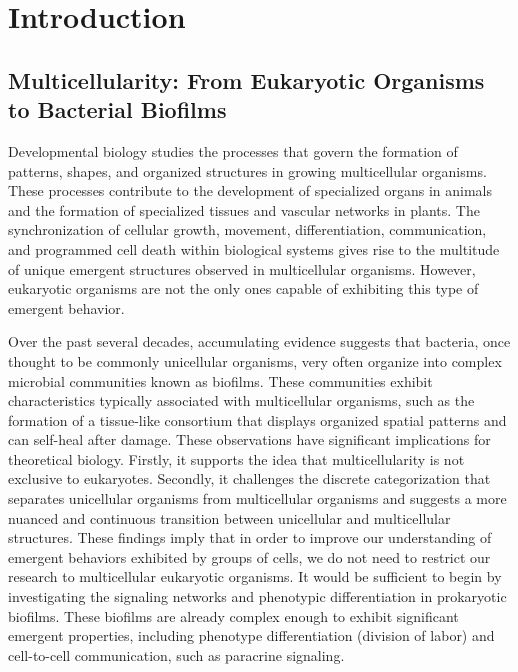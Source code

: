 \chapter{Introduction}\label{chap:intro}
\section{Multicellularity: From Eukaryotic Organisms to Bacterial Biofilms}
Developmental biology studies the processes that govern the formation of patterns, shapes, and organized structures in growing multicellular organisms. These processes contribute to the development of specialized organs in animals and the formation of specialized tissues and vascular networks in plants. The synchronization of cellular growth, movement, differentiation, communication, and programmed cell death within biological systems gives rise to the multitude of unique emergent structures observed in multicellular organisms. However, eukaryotic organisms are not the only ones capable of exhibiting this type of emergent behavior.{\footnotesize\cite{Niklas2019}\cite{Lyons2015}}

Over the past several decades, accumulating evidence suggests that bacteria, once thought to be commonly unicellular organisms, very often organize into complex microbial communities known as biofilms. {\footnotesize\cite{Vlamakis2008}} These communities exhibit characteristics typically associated with multicellular organisms, such as the formation of a tissue-like consortium that displays organized spatial patterns and can self-heal after damage{\footnotesize\cite{Srinivasan2018}\cite{Wang2021}\cite{Dong2022}\cite{Dong2022_1}}. These observations have significant implications for theoretical biology. Firstly, it supports the idea that multicellularity is not exclusive to eukaryotes. Secondly, it challenges the discrete categorization that separates unicellular organisms from multicellular organisms and suggests a more nuanced and continuous transition between unicellular and multicellular structures. These findings imply that in order to improve our understanding of emergent behaviors exhibited by groups of cells, we do not need to restrict our research to multicellular eukaryotic organisms. It would be sufficient to begin by investigating the signaling networks and phenotypic differentiation in prokaryotic biofilms. These biofilms are already complex enough to exhibit significant emergent properties, including phenotype differentiation (division of labor) and cell-to-cell communication, such as paracrine signaling.{\footnotesize\cite{Lpez2009}}


